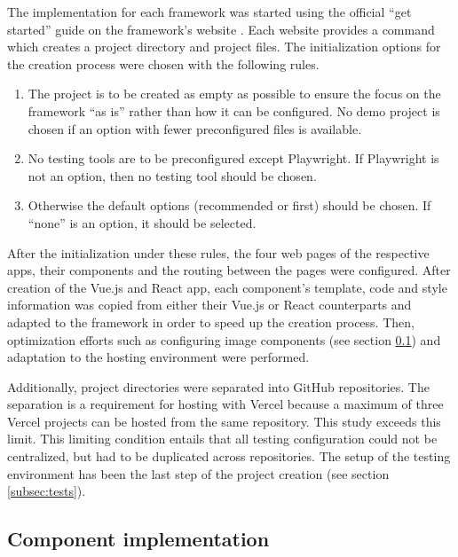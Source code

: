 \documentclass[a4paper, 12pt]{article}
\begin{document}
The implementation for each framework was started using the official \enquote{get started} guide on the framework's website \citep{AngularGetStarted,AstroGetStarted,NextGetStarted,NuxtGetStarted,ReactGetStarted,SvelteGetStarted,VueGetStarted}.
Each website provides a command which creates a project directory and project files.
The initialization options for the creation process were chosen with the following rules.

\begin{enumerate}
  \item The project is to be created as empty as possible to ensure the focus on the framework \enquote{as is} rather than how it can be configured.
  No demo project is chosen if an option with fewer preconfigured files is available.
  \item No testing tools are to be preconfigured except Playwright.
  If Playwright is not an option, then no testing tool should be chosen.
  \item Otherwise the default options (recommended or first) should be chosen.
  If \enquote{none} is an option, it should be selected.
\end{enumerate}

After the initialization under these rules, the four web pages of the respective apps, their components and the routing between the pages were configured.
After creation of the Vue.js and React app, each component's template, code and style information was copied from either their Vue.js or React counterparts and adapted to the framework in order to speed up the creation process.
Then, optimization efforts such as configuring image components (see section \ref{subsec:components}) and adaptation to the hosting environment were performed.

Additionally, project directories were separated into GitHub repositories.
The separation is a requirement for hosting with Vercel because a maximum of three Vercel projects can be hosted from the same repository.
This study exceeds this limit.
This limiting condition entails that all testing configuration could not be centralized, but had to be duplicated across repositories.
The setup of the testing environment has been the last step of the project creation (see section \ref{subsec:tests}).

\subsection{Component implementation}\label{subsec:components}
% 
\end{document}
